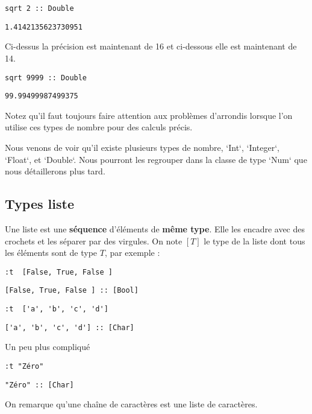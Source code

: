 \documentclass[11pt]{article}
\begin{document}
\begin{verbatim}
sqrt 2 :: Double
\end{verbatim}
\begin{verbatim}
1.4142135623730951
\end{verbatim}


Ci-dessus la précision est maintenant de 16 et ci-dessous elle est maintenant de 14.
\begin{verbatim}
sqrt 9999 :: Double
\end{verbatim}
\begin{verbatim}
99.99499987499375
\end{verbatim}


Notez qu'il faut toujours faire attention aux problèmes d'arrondis lorsque l'on utilise ces types de nombre pour des calculs précis.


Nous venons de voir qu'il existe plusieurs types de nombre, `Int`, `Integer`, `Float`, et `Double`.    Nous pourront les regrouper dans la classe de type `Num` que nous détaillerons plus tard.

\subsection{Types liste}
\label{sec:org5f2d9e3}

Une liste est une \textbf{séquence} d'éléments de \textbf{même type}.   Elle les  encadre avec des crochets et les séparer par des virgules.   On note \([T]\) le type de la liste dont tous les éléments sont de type \(T\), par exemple :

\begin{verbatim}
:t  [False, True, False ] 
\end{verbatim}
\begin{verbatim}
[False, True, False ] :: [Bool]
\end{verbatim}

\begin{verbatim}
:t  ['a', 'b', 'c', 'd']
\end{verbatim}
\begin{verbatim}
['a', 'b', 'c', 'd'] :: [Char]
\end{verbatim}


Un peu plus compliqué
\begin{verbatim}
:t "Zéro"
\end{verbatim}
\begin{verbatim}
"Zéro" :: [Char]
\end{verbatim}

On remarque qu'une chaîne de caractères est une liste de caractères.
\end{document}
